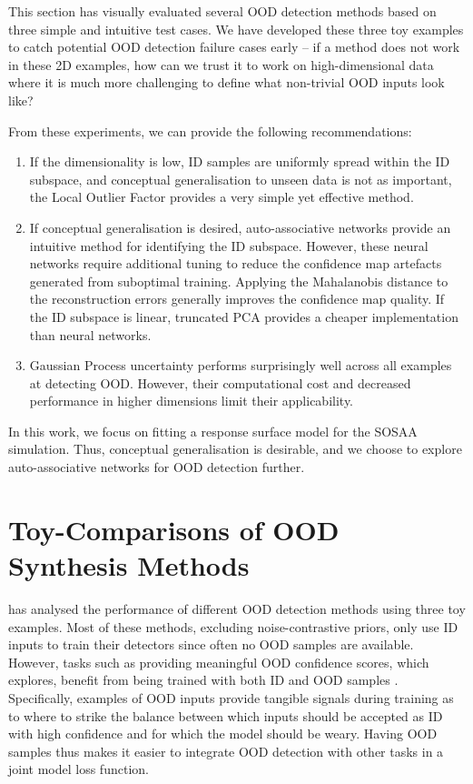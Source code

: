 This section has visually evaluated several OOD detection methods based on three simple and intuitive test cases. We have developed these three toy examples to catch potential OOD detection failure cases early -- if a method does not work in these 2D examples, how can we trust it to work on high-dimensional data where it is much more challenging to define what non-trivial OOD inputs look like?

\newpar From these experiments, we can provide the following recommendations:
\begin{enumerate}
    \item If the dimensionality is low, ID samples are uniformly spread within the ID subspace, and conceptual generalisation to unseen data is not as important, the Local Outlier Factor provides a very simple yet effective method.
    \item If conceptual generalisation is desired, auto-associative networks provide an intuitive method for identifying the ID subspace. However, these neural networks require additional tuning to reduce the confidence map artefacts generated from suboptimal training. Applying the Mahalanobis distance to the reconstruction errors generally improves the confidence map quality. If the ID subspace is linear, truncated PCA provides a cheaper implementation than neural networks.
    \item Gaussian Process uncertainty performs surprisingly well across all examples at detecting OOD. However, their computational cost and decreased performance in higher dimensions limit their applicability.
\end{enumerate}

\noindent In this work, we focus on fitting a response surface model for the SOSAA simulation. Thus, conceptual generalisation is desirable, and we choose to explore auto-associative networks for OOD detection further.

\section{Toy-Comparisons of OOD Synthesis Methods} \label{txt:ood-synthesis-analysis}

 has analysed the performance of different OOD detection methods using three toy examples. Most of these methods, excluding noise-contrastive priors, only use ID inputs to train their detectors since often no OOD samples are available. However, tasks such as providing meaningful OOD confidence scores, which  explores, benefit from being trained with both ID and OOD samples \cite{ood-exposure-2018}. Specifically, examples of OOD inputs provide tangible signals during training as to where to strike the balance between which inputs should be accepted as ID with high confidence and for which the model should be weary. Having OOD samples thus makes it easier to integrate OOD detection with other tasks in a joint model loss function.

